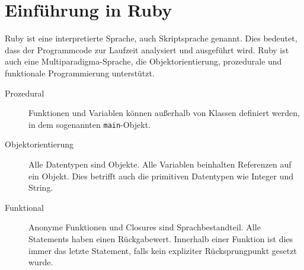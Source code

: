 \section{Einführung in Ruby}
Ruby ist eine interpretierte Sprache, auch Skriptsprache genannt. Dies bedeutet, dass der Programmcode zur Laufzeit analysiert und ausgeführt wird. Ruby ist auch eine Multiparadigma-Sprache, die Objektorientierung, prozedurale und funktionale Programmierung unterstützt.
\begin{description}
 \item[Prozedural] Funktionen und Variablen können außerhalb von Klassen definiert werden, in dem sogenannten \texttt{main}-Objekt.
 \item[Objektorientierung] Alle Datentypen sind Objekte. Alle Variablen beinhalten Referenzen auf ein Objekt. Dies betrifft auch die primitiven Datentypen wie Integer und String.
 \item[Funktional] Anonyme Funktionen und Closures sind Sprachbestandteil. Alle Statements haben einen Rückgabewert. Innerhalb einer Funktion ist dies immer das letzte Statement, falls kein expliziter Rücksprungpunkt gesetzt wurde.
\end{description}


